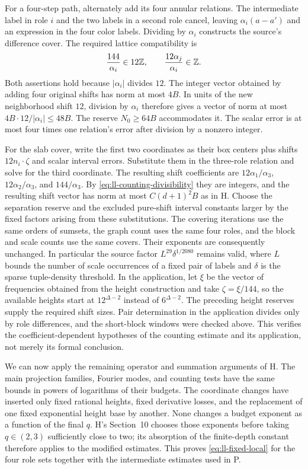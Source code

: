 For a four-step path, alternately add its four annular relations.
The intermediate label in role $i$ and the two labels in a second
role cancel, leaving $\alpha_i(a-a')$ and an expression in the
four color labels.  Dividing by $\alpha_i$ constructs the source's
difference cover.  The required lattice compatibility is
\begin{equation}
 \frac{144}{\alpha_i}\in12\mathbb Z,
 \qquad \frac{12\alpha_j}{\alpha_i}\in\mathbb Z.
 \label{eq:ll-counting-divisibility}
\end{equation}
Both assertions hold because $|\alpha_i|$ divides $12$.
The integer vector obtained by adding four original shifts has
norm at most $4B$.  In units of the new neighborhood shift $12$,
division by $\alpha_i$ therefore gives a vector of norm at most
$4B\cdot12/|\alpha_i|\le48B$.
The reserve $N_0\ge64B$ accommodates it.  The scalar error is at most
four times one relation's error after division by a nonzero integer.

For the slab cover, write the first two coordinates as their box
centers plus shifts $12n_i\cdot\zeta$ and scalar interval errors.
Substitute them in the three-role relation and solve for the third
coordinate.  The resulting shift coefficients are
$12\alpha_1/\alpha_3$, $12\alpha_2/\alpha_3$, and
$144/\alpha_3$.  By \eqref{eq:ll-counting-divisibility} they are
integers, and the resulting shift vector has norm at most
$C(d+1)^2B$ as in H.  Choose the separation reserve and
the excluded pure-shift interval constants larger by the fixed
factors arising from these substitutions.  The covering iterations
use the same orders of sumsets, the graph count uses the same four
roles, and the block and scale counts use the same covers.  Their
exponents are consequently unchanged.  In particular the source
factor $L^{29}\delta^{1/2080}$ remains valid, where $L$ bounds the
number of scale occurrences of a fixed pair of labels and $\delta$
is the sparse tuple-density threshold.  In the application, let
$\xi$ be the vector of frequencies obtained from the height
construction and take $\zeta=\xi/144$, so the available heights start at
$12^{\Delta-2}$ instead of $6^{\Delta-2}$.  The preceding height
reserves supply the required shift sizes.  Pair determination in
the application divides only by role differences, and the
short-block windows were checked above.  This verifies the
coefficient-dependent hypotheses of the counting estimate and its
application, not merely its formal conclusion.

We can now apply the remaining operator and summation arguments of
H.  The main projection families, Fourier modes, and counting tests
have the same bounds in powers of logarithms of their budgets.  The
coordinate changes have inserted only fixed rational heights,
fixed derivative losses, and the replacement of one fixed
exponential height base by another.  None changes a budget exponent
as a function of the final $q$.  H's Section~10 chooses those
exponents before taking $q\in(2,3)$ sufficiently close to two;
its absorption of the finite-depth constant therefore applies to
the modified estimates.  This proves \eqref{eq:ll-fixed-local} for
the four role sets together with the intermediate estimates used
in P.

